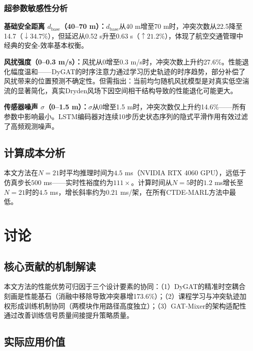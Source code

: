 \documentclass[12pt,a4paper,UTF8]{ctexart}
\begin{document}
\subsubsection{超参数敏感性分析}

\textbf{基础安全距离 $d_{\text{base}}$（40--70 m）：}$d_{\text{base}}$从40 m增至70 m时，冲突次数从22.5降至14.7（$\downarrow 34.7\%$），但延迟从0.52 s升至0.63 s（$\uparrow 21.2\%$），体现了航空交通管理中经典的安全-效率基本权衡。

\textbf{风扰强度（0--0.3 m/s）：}风扰从0增至0.3 m/s时，冲突次数上升约27.6\%。性能退化幅度温和——DyGAT的时序注意力通过学习历史轨迹的时序趋势，部分补偿了风扰带来的位置预测不确定性。但需指出：当前均匀随机风扰模型是对真实低空湍流的显著简化，真实Dryden风场下因空间相干结构导致的性能退化可能更大。

\textbf{传感器噪声 $\sigma$（0--1.5 m）：}$\sigma$从0增至1.5 m时，冲突次数仅上升约14.6\%——所有参数中影响最小。LSTM编码器对连续10步历史状态序列的隐式平滑作用有效过滤了高频观测噪声。

\subsection{计算成本分析}

本文方法在$N=21$时平均推理时间为$4.5$ ms（NVIDIA RTX 4060 GPU），远低于仿真步长$500$ ms——实时性裕度约为$111\times$。计算时间从$N=5$时的$1.2$ ms增长至$N=21$时的$4.5$ ms，增长斜率约为$0.21$ ms/架，在所有CTDE-MARL方法中最低。

\section{讨论}

\subsection{核心贡献的机制解读}

本文方法的性能优势可归因于三个设计要素的协同：（1）DyGAT的精准时空耦合刻画是性能基石（消融中移除导致冲突暴增173.6\%）；（2）课程学习与冲突轨迹加权形成训练机制协同（两模块作用路径高度独立）；（3）GAT-Mixer的架构适配性通过改善训练信号质量间接提升策略质量。

\subsection{实际应用价值}
\end{document}
